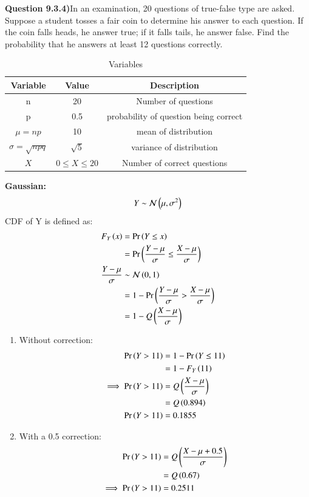 \documentclass[journal,12pt,twocolumn]{IEEEtran}
\theoremstyle{remark}
\begin{document}
\textbf{Question 9.3.4)}In an examination, 20 questions of true-false type are asked. Suppose a student tosses
a fair coin to determine his answer to each question. If the coin falls heads, he answer
true; if it falls tails, he answer false. Find the probability that he answers at least 12
questions correctly.\\
\solution 
\fi
\begin{table}[ht]
    \centering
    \caption{Variables}
    \label{table:random-variables-9.3.4}
\begin{tabular}{|c|c|c|}
\hline
Variable & Value & Description \\
\hline
n & 20 & Number of questions\\
\hline
p & 0.5 & probability of question being correct\\
\hline
$\mu=np$ & 10 & mean of distribution\\
\hline
$\sigma=\sqrt{npq}$ & $\sqrt{5}$ & variance of distribution\\
\hline
$X$ & $0 \le X \le 20$ & Number of correct questions \\
\hline
\end{tabular} 
\end{table}
\textbf{Gaussian:}
\begin{align}
Y \sim \mathcal{N}\left(\mu,\sigma^2\right)
\end{align}
CDF of Y is defined as:
\begin{align}
F_Y\left(x\right) &= \Pr\left(Y \le x\right)\\
&= \Pr\left(\frac{Y-\mu}{\sigma} \le \frac{X-\mu}{\sigma}\right)\\
\frac{Y-\mu}{\sigma} &\sim \mathcal{N}\left(0,1\right)\\
&= 1-\Pr\left(\frac{Y-\mu}{\sigma} > \frac{X-\mu}{\sigma}\right)\\
&= 1-Q\left(\frac{X-\mu}{\sigma}\right)
\end{align}
\begin{enumerate}
\item Without correction:
\begin{align}
\Pr\left(Y > 11\right) &= 1-\Pr\left(Y \le 11\right)\\
&= 1-F_Y\left(11\right)\\
\implies \Pr\left(Y > 11\right) &= Q\left(\frac{X-\mu}{\sigma}\right)\\
&= Q\left(0.894\right)\\
\Pr\left(Y > 11\right) &= 0.1855
\end{align}
\item With a 0.5 correction:
\begin{align}
\Pr\left(Y > 11\right) &= Q\left(\frac{X-\mu+0.5}{\sigma}\right)\\
&= Q\left(0.67\right)\\
\implies \Pr\left(Y > 11\right) &= 0.2511
\end{align}
\end{enumerate}
\end{document}
